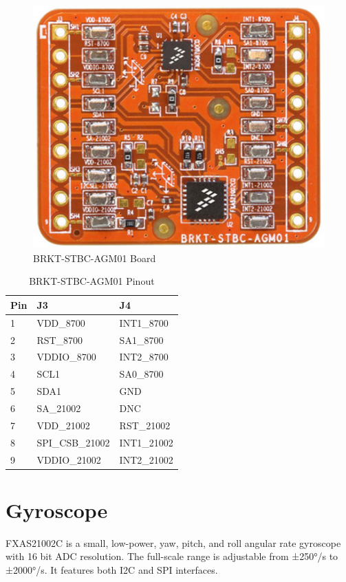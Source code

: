 \documentclass[letterpaper]{report}
\begin{document}
\begin{figure}[H]
	\includegraphics[scale=0.25]{brkt-stbc-agm01}
	\centering
	\caption{BRKT-STBC-AGM01 Board}
\end{figure}

\begin{table}[H]
	\centering
	\begin{tabular}{ | l | l | l |} \hline
	Pin	& J3		&J4		\\ \hline \hline
	1	& VDD\_8700	& INT1\_8700	\\ \hline
	2	& RST\_8700		& SA1\_8700		\\ \hline
	3	& VDDIO\_8700	& INT2\_8700	\\ \hline
	4	& SCL1		& SA0\_8700		\\ \hline
	5	& SDA1		& GND			\\ \hline
	6	& SA\_21002		& DNC			\\ \hline
	7	& VDD\_21002	& RST\_21002	\\ \hline
	8	& SPI\_CSB\_21002	& INT1\_21002	\\ \hline
	9	& VDDIO\_21002	& INT2\_21002	\\ \hline
    \end{tabular}
    \caption{BRKT-STBC-AGM01 Pinout}
\end{table}



\section{Gyroscope}
FXAS21002C is a small, low-power, yaw, pitch, and roll angular rate gyroscope with 16 bit ADC resolution. The full-scale range is adjustable from ±250°/s to ±2000°/s. It features both I2C and SPI interfaces.
\end{document}
